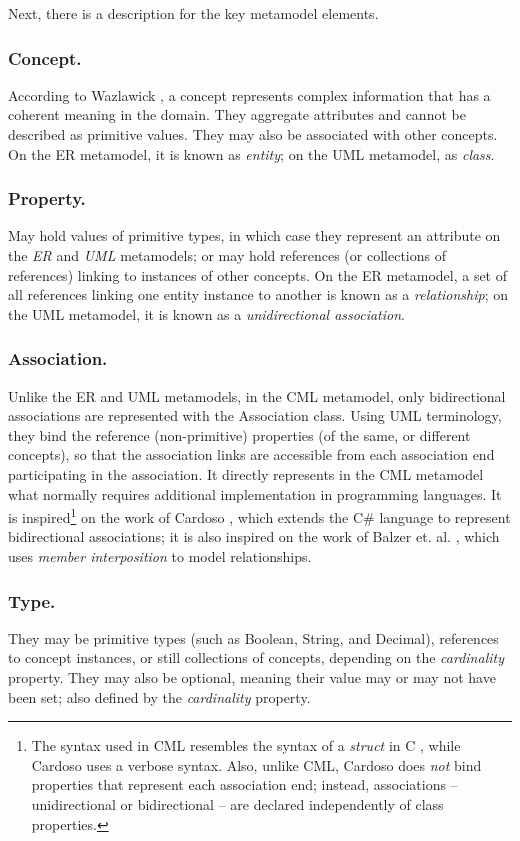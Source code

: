 Next, there is a description for the key metamodel elements.

\subsubsection{Concept.}

According to Wazlawick \cite{wazlawick},
a concept represents complex information that has a coherent meaning in the domain.
They aggregate attributes and cannot be described as primitive values.
They may also be associated with other concepts.
On the ER metamodel, it is known as \emph{entity};
on the UML metamodel, as \emph{class}.

\subsubsection{Property.}

May hold values of primitive types, in which case they represent an attribute on the \emph{ER} and \emph{UML} metamodels;
or may hold references (or collections of references) linking to instances of other concepts.
On the ER metamodel,
a set of all references linking one entity instance to another is known as a \emph{relationship};
on the UML metamodel, it is known as a \emph{unidirectional association}.

\subsubsection{Association.}

Unlike the ER and UML metamodels, in the CML metamodel, only bidirectional associations are represented with the Association class. Using UML terminology, they bind the reference (non-primitive) properties (of the same, or different concepts),
so that the association links are accessible from each association end participating in the association.
It directly represents in the CML metamodel what normally requires additional implementation in programming languages.
It is inspired\footnote{The syntax used in CML resembles the syntax of a \emph{struct} in C \cite{clang}, while Cardoso \cite{cardoso} uses a verbose syntax. Also, unlike CML, Cardoso does \emph{not} bind properties that represent each association end; instead, associations -- unidirectional or bidirectional -- are declared independently of class properties.} on the work of Cardoso \cite{cardoso}, which extends the C\# language to represent bidirectional associations; it is also inspired on the work of Balzer et. al. \cite{balzer}, which uses \emph{member interposition} to model relationships.

\subsubsection{Type.} They may be primitive types (such as Boolean, String, and Decimal), references to concept instances, or still collections of concepts, depending on the \emph{cardinality} property. They may also be optional, meaning their value may or may not have been set; also defined by the \emph{cardinality} property.
